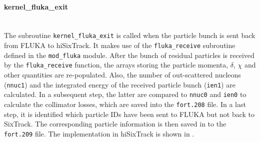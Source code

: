 \begin{appendices}
\paragraph{kernel\_fluka\_exit}
\mbox{} \\
The subroutine \texttt{kernel\_fluka\_exit} is called when the particle bunch is sent back from FLUKA to hiSixTrack. It makes use of the \texttt{fluka\_receive} subroutine defined in the \texttt{mod\_fluka} module. After the bunch of residual particles is received by the \texttt{fluka\_receive} function, the arrays storing the particle momenta, $\delta$, $\chi$ and other quantities are re-populated. Also, the number of out-scattered nucleons (\texttt{nnuc1}) and the integrated energy of the received particle bunch (\texttt{ien1}) are calculated. In a subsequent step, the latter are compared to \texttt{nnuc0} and \texttt{ien0} to calculate the collimator losses, which are saved into the \texttt{fort.208} file. In a last step, it is identified which particle IDs have been sent to FLUKA but not back to SixTrack. The corresponding particle information is then saved in to the \texttt{fort.209} file. The implementation in hiSixTrack is shown in .

\vspace{0.5cm}
\begin{minipage}{\linewidth}
\begin{lstlisting}[language=Fortran,caption=Receive particles from FLUKA as implemented in hiSixTrack.,label=lst:coupling_rec]


\end{lstlisting}
\end{minipage}
\end{appendices}
